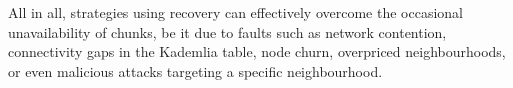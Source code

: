 \documentclass[manuscript,screen,review]{acmart}
\begin{document}
%
%




All in all, strategies using recovery can effectively overcome the occasional unavailability of chunks, be it due to faults such as network contention, connectivity gaps in the Kademlia table, node churn, overpriced neighbourhoods, or even malicious attacks targeting a specific neighbourhood. 
\end{document}
